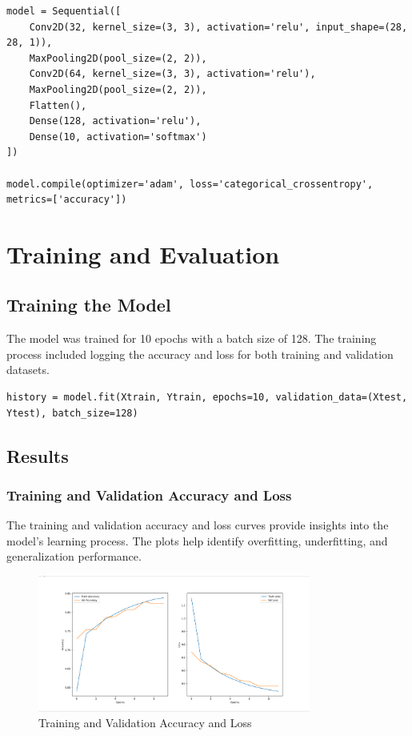 \documentclass[a4paper,10pt]{article}
\begin{document}
\begin{verbatim}
model = Sequential([
    Conv2D(32, kernel_size=(3, 3), activation='relu', input_shape=(28, 28, 1)),
    MaxPooling2D(pool_size=(2, 2)),
    Conv2D(64, kernel_size=(3, 3), activation='relu'),
    MaxPooling2D(pool_size=(2, 2)),
    Flatten(),
    Dense(128, activation='relu'),
    Dense(10, activation='softmax')
])

model.compile(optimizer='adam', loss='categorical_crossentropy', metrics=['accuracy'])
\end{verbatim}

\section{Training and Evaluation}

\subsection{Training the Model}
The model was trained for 10 epochs with a batch size of 128. The training process included logging the accuracy and loss for both training and validation datasets.

\begin{verbatim}
history = model.fit(Xtrain, Ytrain, epochs=10, validation_data=(Xtest, Ytest), batch_size=128)
\end{verbatim}

\subsection{Results}

\subsubsection{Training and Validation Accuracy and Loss}
The training and validation accuracy and loss curves provide insights into the model's learning process. The plots help identify overfitting, underfitting, and generalization performance.

\begin{figure}[h]
\centering
\includegraphics[width=0.8\textwidth]{2.png}
\caption{Training and Validation Accuracy and Loss}
\end{figure}
\end{document}
